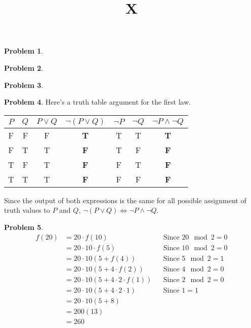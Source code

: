 \documentclass{article}
\title{X}
\numberwithin{pic}{section}
\numberwithin{lem}{section}
\numberwithin{thm}{section}
\numberwithin{cor}{section}
\theoremstyle{definition}
\numberwithin{ex}{section}
\numberwithin{defn}{section}
\theoremstyle{definition}
\newtheorem{prob}{Problem}
\theoremstyle{remark}
\begin{document}
\pagestyle{fancy}

\begin{prob}
  
\end{prob}

\begin{prob}
  
\end{prob}
\begin{prob}
  
\end{prob}
\begin{prob} Here's a truth table argument for the first law.\\
  \begin{center}
  \begin{tabular}{c c | c c | c c c}
    $P$ & $Q$ & $P \vee Q$ & $\neg(P \vee Q)$ & $\neg P$ & $\neg Q$ & $\neg P \wedge \neg Q$\\
    \hline
    F & F & F & \textbf{T} & T & T & \textbf{T}\\
    F & T & T & \textbf{F} & T & F & \textbf{F}\\
    T & F & T & \textbf{F} & F & T & \textbf{F}\\
    T & T & T & \textbf{F} & F & F & \textbf{F}
  \end{tabular}
\end{center}
Since the output of both expressions is the same for all possible assignment of truth values to $P$ and $Q$, $\neg(P \vee Q) \iff \neg P \wedge \neg Q$.
\end{prob}

\begin{prob}
  \begin{align*}
    f(20) &= 20\cdot f(10) &&\text{Since }20 \mod 2 = 0\\
          &= 20\cdot 10\cdot f(5) &&\text{Since }10\mod 2 = 0\\
          &= 20\cdot 10(5 + f(4)) &&\text{Since }5\mod 2 = 1\\
          &= 20\cdot 10(5 + 4\cdot f(2)) &&\text{Since }4\mod 2 = 0\\
          &= 20\cdot 10(5 + 4\cdot 2 \cdot f(1)) &&\text{Since }2\mod 2 = 0\\
          &= 20\cdot 10(5 + 4\cdot 2 \cdot 1) &&\text{Since }1 = 1\\
          &= 20\cdot 10(5 + 8) && \\
          &= 200(13) && \\
          &= 260 &&
  \end{align*}
\end{prob}
\end{document}
